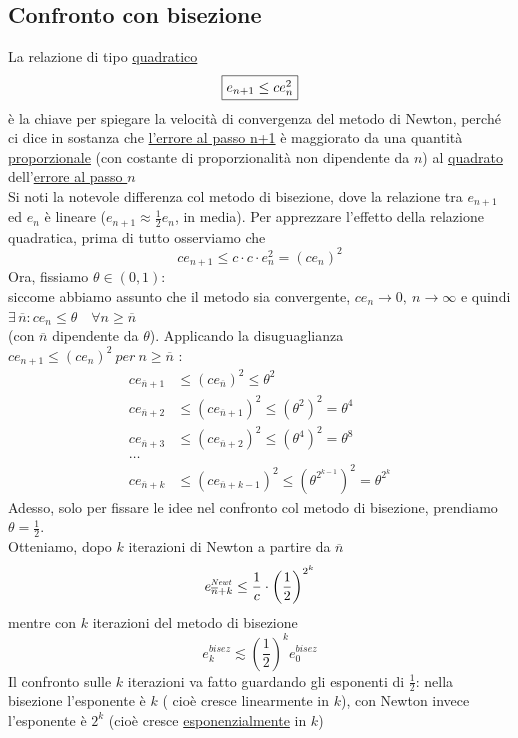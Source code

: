 \documentclass[12pt]{article}
\begin{document}
\subsection{Confronto con bisezione}
La relazione di tipo \uline{quadratico}
\[\fbox{$e_{n+1}\leq ce_n^2$}\]
è la chiave per spiegare la velocità di convergenza del metodo di Newton, perché ci dice in sostanza che \uline{l'errore  al passo n+1} è maggiorato da una quantità \uline{proporzionale} (con costante di proporzionalità non dipendente da $n$) al \uline{quadrato} dell'\uline{errore al passo $n$} \\
Si noti la notevole differenza col metodo di bisezione, dove la relazione tra $e_{n+1}$ ed $e_n$ è lineare ($e_{n+1} \approx \frac{1}{2} e_n$, in media).
Per apprezzare l'effetto della relazione quadratica, prima di tutto osserviamo che
\[ ce_{n+1} \leq c \cdot c \cdot e_{n}^2 = ( ce_n)^2\]
Ora, fissiamo $\theta \in (0,1)$:\\
siccome abbiamo assunto che il metodo sia convergente, $ce_n\rightarrow0,\ n\rightarrow\infty$ e quindi $\exists \,\overline{n} : ce_n \leq \theta \quad \forall n \geq \overline{n}$\\
(con $\overline{n}$ dipendente da $\theta$). Applicando la disuguaglianza  $ce_{n+1} \leq (ce_n)^2 \ per \ n \geq \overline{n}$ : 
\[\begin{split}
    ce_{\overline{n}+1} & \le (ce_{\overline{n}})^2 \le \theta^2 \\
    ce_{\overline{n}+2} & \le (ce_{\overline{n}+1})^2\le \left(\theta^2\right)^2 = \theta^4 \\
    ce_{\overline{n}+3} & \le (ce_{\overline{n}+2})^2 \le \left(\theta^4\right)^2 = \theta^8 \\
    \dotso \\
    ce_{\overline{n}+k}& \le (ce_{\overline{n}+k-1})^2 \le \left(\theta^{2^{k-1}}\right)^2 = \theta^{2^k}
\end{split} \]
Adesso, solo per fissare le idee nel confronto col metodo di bisezione, prendiamo $\theta=\frac{1}{2}$. \\
Otteniamo, dopo $k$ iterazioni di Newton a partire da $\overline{n}$ \\
\[e^{\scalebox{.6}{$Newt$}}_{\overline{n}+k}\leq\frac{1}{c}\cdot\left(\frac{1}{2}\right)^{2^k}\]
mentre con $k$ iterazioni del metodo di bisezione 
\[ e^{bisez}_{k}\lesssim \left(\frac{1}{2}\right)^k e_{0}^{bisez}\]
Il confronto sulle $k$ iterazioni va fatto guardando gli esponenti
di $\frac{1}{2}$: nella bisezione l'esponente è $k$ ( cioè cresce linearmente in $k$), con Newton invece l'esponente è $2^k$ (cioè cresce \uline{esponenzialmente} in $k$)\\
\end{document}

